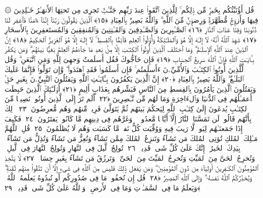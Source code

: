  ۞ قُل أَؤُنَبِّئُكُم بِخَيرٍۢ مِّن ذَٟلِكُم ۚ لِلَّذِينَ ٱتَّقَوا۟ عِندَ رَبِّهِم جَنَّـٰتٌۭ تَجرِى مِن تَحتِهَا ٱلأَنهَـٰرُ خَـٰلِدِينَ فِيهَا وَأَزوَٟجٌۭ مُّطَهَّرَةٌۭ وَرِضوَٟنٌۭ مِّنَ ٱللَّهِ ۗ وَٱللَّهُ بَصِيرٌۢ بِٱلعِبَادِ ﴿١٥﴾
 ٱلَّذِينَ يَقُولُونَ رَبَّنَآ إِنَّنَآ ءَامَنَّا فَٱغفِر لَنَا ذُنُوبَنَا وَقِنَا عَذَابَ ٱلنَّارِ ﴿١٦﴾
 ٱلصَّـٰبِرِينَ وَٱلصَّـٰدِقِينَ وَٱلقَـٰنِتِينَ وَٱلمُنفِقِينَ وَٱلمُستَغفِرِينَ بِٱلأَسحَارِ ﴿١٧﴾
 شَهِدَ ٱللَّهُ أَنَّهُۥ لَآ إِلَـٰهَ إِلَّا هُوَ وَٱلمَلَـٰٓئِكَةُ وَأُو۟لُوا۟ ٱلعِلمِ قَآئِمًۢا بِٱلقِسطِ ۚ لَآ إِلَـٰهَ إِلَّا هُوَ ٱلعَزِيزُ ٱلحَكِيمُ ﴿١٨﴾
 إِنَّ ٱلدِّينَ عِندَ ٱللَّهِ ٱلإِسلَـٰمُ ۗ وَمَا ٱختَلَفَ ٱلَّذِينَ أُوتُوا۟ ٱلكِتَـٰبَ إِلَّا مِنۢ بَعدِ مَا جَآءَهُمُ ٱلعِلمُ بَغيًۢا بَينَهُم ۗ وَمَن يَكفُر بِـَٔايَـٰتِ ٱللَّهِ فَإِنَّ ٱللَّهَ سَرِيعُ ٱلحِسَابِ ﴿١٩﴾
 فَإِن حَآجُّوكَ فَقُل أَسلَمتُ وَجهِىَ لِلَّهِ وَمَنِ ٱتَّبَعَنِ ۗ وَقُل لِّلَّذِينَ أُوتُوا۟ ٱلكِتَـٰبَ وَٱلأُمِّيِّۦنَ ءَأَسلَمتُم ۚ فَإِن أَسلَمُوا۟ فَقَدِ ٱهتَدَوا۟ ۖ وَّإِن تَوَلَّوا۟ فَإِنَّمَا عَلَيكَ ٱلبَلَـٰغُ ۗ وَٱللَّهُ بَصِيرٌۢ بِٱلعِبَادِ ﴿٢٠﴾
 إِنَّ ٱلَّذِينَ يَكفُرُونَ بِـَٔايَـٰتِ ٱللَّهِ وَيَقتُلُونَ ٱلنَّبِيِّۦنَ بِغَيرِ حَقٍّۢ وَيَقتُلُونَ ٱلَّذِينَ يَأمُرُونَ بِٱلقِسطِ مِنَ ٱلنَّاسِ فَبَشِّرهُم بِعَذَابٍ أَلِيمٍ ﴿٢١﴾
 أُو۟لَـٰٓئِكَ ٱلَّذِينَ حَبِطَت أَعمَـٰلُهُم فِى ٱلدُّنيَا وَٱلءَاخِرَةِ وَمَا لَهُم مِّن نَّـٰصِرِينَ ﴿٢٢﴾
 أَلَم تَرَ إِلَى ٱلَّذِينَ أُوتُوا۟ نَصِيبًۭا مِّنَ ٱلكِتَـٰبِ يُدعَونَ إِلَىٰ كِتَـٰبِ ٱللَّهِ لِيَحكُمَ بَينَهُم ثُمَّ يَتَوَلَّىٰ فَرِيقٌۭ مِّنهُم وَهُم مُّعرِضُونَ ﴿٢٣﴾
 ذَٟلِكَ بِأَنَّهُم قَالُوا۟ لَن تَمَسَّنَا ٱلنَّارُ إِلَّآ أَيَّامًۭا مَّعدُودَٟتٍۢ ۖ وَغَرَّهُم فِى دِينِهِم مَّا كَانُوا۟ يَفتَرُونَ ﴿٢٤﴾
 فَكَيفَ إِذَا جَمَعنَـٰهُم لِيَومٍۢ لَّا رَيبَ فِيهِ وَوُفِّيَت كُلُّ نَفسٍۢ مَّا كَسَبَت وَهُم لَا يُظلَمُونَ ﴿٢٥﴾
 قُلِ ٱللَّهُمَّ مَـٰلِكَ ٱلمُلكِ تُؤتِى ٱلمُلكَ مَن تَشَآءُ وَتَنزِعُ ٱلمُلكَ مِمَّن تَشَآءُ وَتُعِزُّ مَن تَشَآءُ وَتُذِلُّ مَن تَشَآءُ ۖ بِيَدِكَ ٱلخَيرُ ۖ إِنَّكَ عَلَىٰ كُلِّ شَىءٍۢ قَدِيرٌۭ ﴿٢٦﴾
 تُولِجُ ٱلَّيلَ فِى ٱلنَّهَارِ وَتُولِجُ ٱلنَّهَارَ فِى ٱلَّيلِ ۖ وَتُخرِجُ ٱلحَىَّ مِنَ ٱلمَيِّتِ وَتُخرِجُ ٱلمَيِّتَ مِنَ ٱلحَىِّ ۖ وَتَرزُقُ مَن تَشَآءُ بِغَيرِ حِسَابٍۢ ﴿٢٧﴾
 لَّا يَتَّخِذِ ٱلمُؤمِنُونَ ٱلكَـٰفِرِينَ أَولِيَآءَ مِن دُونِ ٱلمُؤمِنِينَ ۖ وَمَن يَفعَل ذَٟلِكَ فَلَيسَ مِنَ ٱللَّهِ فِى شَىءٍ إِلَّآ أَن تَتَّقُوا۟ مِنهُم تُقَىٰةًۭ ۗ وَيُحَذِّرُكُمُ ٱللَّهُ نَفسَهُۥ ۗ وَإِلَى ٱللَّهِ ٱلمَصِيرُ ﴿٢٨﴾
 قُل إِن تُخفُوا۟ مَا فِى صُدُورِكُم أَو تُبدُوهُ يَعلَمهُ ٱللَّهُ ۗ وَيَعلَمُ مَا فِى ٱلسَّمَـٰوَٟتِ وَمَا فِى ٱلأَرضِ ۗ وَٱللَّهُ عَلَىٰ كُلِّ شَىءٍۢ قَدِيرٌۭ ﴿٢٩﴾
